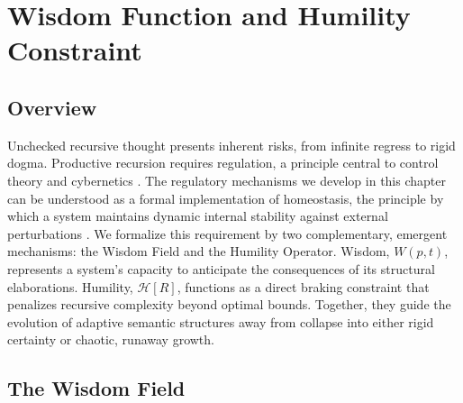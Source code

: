 \chapter{Wisdom Function and Humility Constraint}
\label{ch:wisdom_function_and_humility_constraint}


\section{Overview}

Unchecked recursive thought presents inherent risks, from infinite regress to rigid dogma. Productive recursion requires regulation, a principle central to control theory and cybernetics \autocite{Kalman1960, AndersonMoore1990, Wiener1948, Ashby1952}. The regulatory mechanisms we develop in this chapter can be understood as a formal implementation of homeostasis, the principle by which a system maintains dynamic internal stability against external perturbations \autocite{Cannon1932}. We formalize this requirement by two complementary, emergent mechanisms: the Wisdom Field and the Humility Operator. Wisdom, \(W(p,t)\), represents a system's capacity to anticipate the consequences of its structural elaborations. Humility, \(\mathcal{H}[R]\), functions as a direct braking constraint that penalizes recursive complexity beyond optimal bounds. Together, they guide the evolution of adaptive semantic structures away from collapse into either rigid certainty or chaotic, runaway growth.


\section{The Wisdom Field}
\label{sec:the_wisdom_field}

